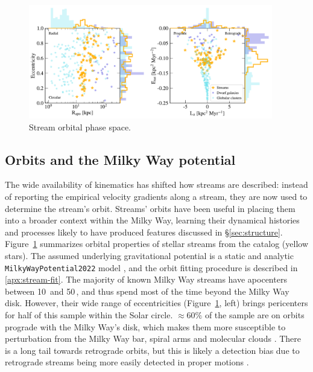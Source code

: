 \documentclass[final,5p,times,twocolumn,authoryear]{elsarticle}
\begin{document}
\begin{figure}
\begin{center}
\includegraphics[width=0.95\textwidth]{figures/orbital_phase_space.pdf}
\end{center}
\caption{%
Stream orbital phase space.
\label{fig:phase_space}
}
\end{figure}

\subsection{Orbits and the Milky Way potential}
\label{sec:mwpotential}
The wide availability of kinematics has shifted how streams are described: instead of reporting the empirical velocity gradients along a stream, they are now used to determine the stream's orbit.
Streams' orbits have been useful in placing them into a broader context within the Milky Way, learning their dynamical histories and processes likely to have produced features discussed in \S\ref{sec:structure}.
Figure~\ref{fig:phase_space} summarizes orbital properties of stellar streams from the \citet{ibata:2023} catalog (yellow stars).
The assumed underlying gravitational potential is a static and analytic \texttt{MilkyWayPotential2022} model \citep{price-whelan:2017}, and the orbit fitting procedure is described in \ref{apx:stream-fit}.
The majority of known Milky Way streams have apocenters between 10\,\unit{\kpc} and 50\,\unit{\kpc}, and thus spend most of the time beyond the Milky Way disk.
However, their wide range of eccentricities (Figure~\ref{fig:phase_space}, left) brings pericenters for half of this sample within the Solar circle.
$\approx60\%$ of the sample are on orbits prograde with the Milky Way's disk, which makes them more susceptible to perturbation from the Milky Way bar, spiral arms and molecular clouds \citep[e.g.,][]{pearson:2017, banik:2019}.
There is a long tail towards retrograde orbits, but this is likely a detection bias due to retrograde streams being more easily detected in proper motions \citep[e.g.,][]{ibata:2021}.
\end{document}
